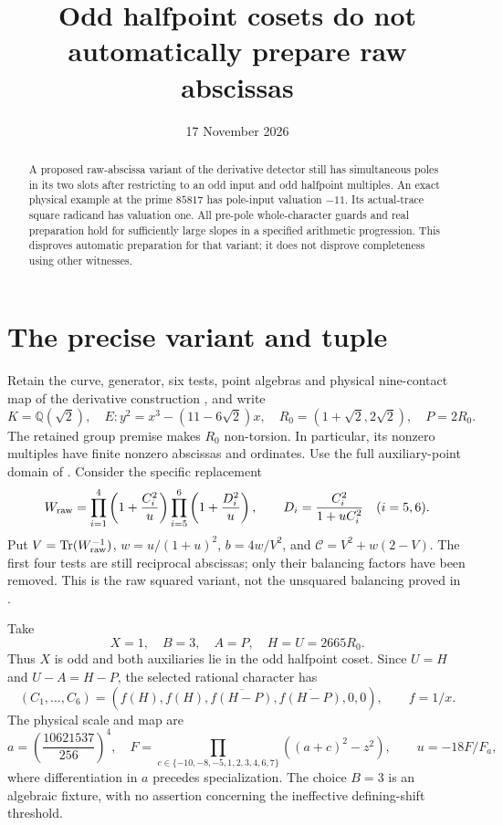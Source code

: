 \documentclass[11pt,a4paper]{article}
\title{Odd halfpoint cosets do not automatically prepare raw abscissas}
\author{}\date{17 November 2026}
\newcommand{\Q}{\mathbb Q}
\DeclareMathOperator{\Tr}{Tr}
\begin{document}
\maketitle
\begin{abstract}
A proposed raw-abscissa variant of the derivative detector still has
simultaneous poles in its two slots after restricting to an odd input
and odd halfpoint multiples. An exact physical example at the prime
$85817$ has pole-input valuation $-11$. Its actual-trace square
radicand has valuation one. All pre-pole whole-character guards and
real preparation hold for sufficiently large slopes in a specified
arithmetic progression. This disproves automatic preparation for that
variant; it does not disprove completeness using other witnesses.
\end{abstract}

\section{The precise variant and tuple}

Retain the curve, generator, six tests, point algebras and physical
nine-contact map of the derivative construction
\cite{Derivative,Full}, and write
\[
 K=\Q(\sqrt2),\quad E:y^2=x^3-(11-6\sqrt2)x,
 \quad R_0=(1+\sqrt2,2\sqrt2),\quad P=2R_0.
\]
The retained group premise makes $R_0$ non-torsion. In particular,
its nonzero multiples have finite nonzero abscissas and ordinates.
Use the full auxiliary-point domain of \cite{Full}. Consider the
specific replacement
\[
 W_{\rm raw}=\prod_{i=1}^4\left(1+\frac{C_i^2}{u}\right)
       \prod_{i=5}^6\left(1+\frac{D_i^2}{u}\right),
 \qquad D_i=\frac{C_i^2}{1+uC_i^2}\quad(i=5,6).
\]
Put $V=\Tr(W_{\rm raw}^{-1})$, $w=u/(1+u)^2$,
$b=4w/V^2$, and $\mathcal C=V^2+w(2-V)$.
The first four tests are still reciprocal abscissas; only their
balancing factors have been removed. This is the raw squared
variant, not the unsquared balancing proved in \cite{Even}.

Take
\[
 X=1,\quad B=3,\quad A=P,\quad H=U=2665R_0.
\]
Thus $X$ is odd and both auxiliaries lie in the odd halfpoint coset.
Since $U=H$ and $U-A=H-P$, the selected rational character has
\[
 (C_1,\ldots,C_6)=(f(H),f(H),\overline{f(H-P)},
                         \overline{f(H-P)},0,0),\qquad f=1/x.
\]
The physical scale and map are
\[
 a=\left(\frac{10621537}{256}\right)^4,\quad
 F=\prod_{c\in\{-10,-8,-5,1,2,3,4,6,7\}}((a+c)^2-z^2),
 \qquad u=-18F/F_a,
\]
where differentiation in $a$ precedes specialization. The choice
$B=3$ is an algebraic fixture, with no assertion concerning the
ineffective defining-shift threshold.
\end{document}
